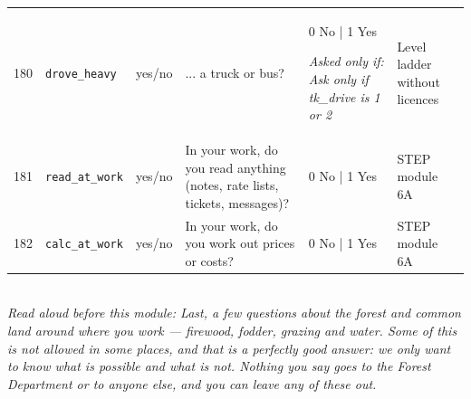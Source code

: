 \documentclass[9pt,a4paper,landscape]{article}
\begin{document}
\begin{longtable}{@{}p{0.5cm}p{3.3cm}p{1.7cm}p{7.3cm}p{5.6cm}p{5.4cm}@{}}
\footnotesize 180 & \footnotesize\texttt{drove\_heavy} & \scriptsize yes/no & \footnotesize ... a truck or bus?\par\vspace{1pt}{\footnotesize\color{hdr}{\hifont ...ट्रक या बस?}} & \scriptsize 0 No | 1 Yes\par\vspace{1pt}\textit{Asked only if: Ask only if tk\_drive is 1 or 2} & \scriptsize Level ladder without licences\\
\footnotesize 181 & \footnotesize\texttt{read\_at\_work} & \scriptsize yes/no & \footnotesize In your work, do you read anything (notes, rate lists, tickets, messages)?\par\vspace{1pt}{\footnotesize\color{hdr}{\hifont अपने काम में क्या आप कुछ पढ़ते हैं (पर्ची, रेट लिस्ट, टिकट, मैसेज)?}} & \scriptsize 0 No | 1 Yes & \scriptsize STEP module 6A\\
\footnotesize 182 & \footnotesize\texttt{calc\_at\_work} & \scriptsize yes/no & \footnotesize In your work, do you work out prices or costs?\par\vspace{1pt}{\footnotesize\color{hdr}{\hifont अपने काम में क्या आप दाम या ख़र्चा जोड़ते-घटाते हैं?}} & \scriptsize 0 No | 1 Yes & \scriptsize STEP module 6A\\
\bottomrule\end{longtable}\vspace{6pt}
\\[3pt]
{\small\itshape Read aloud before this module: Last, a few questions about the forest and common land around where you work — firewood, fodder, grazing and water. Some of this is not allowed in some places, and that is a perfectly good answer: we only want to know what is possible and what is not. Nothing you say goes to the Forest Department or to anyone else, and you can leave any of these out.}\\[5pt]
\end{document}
